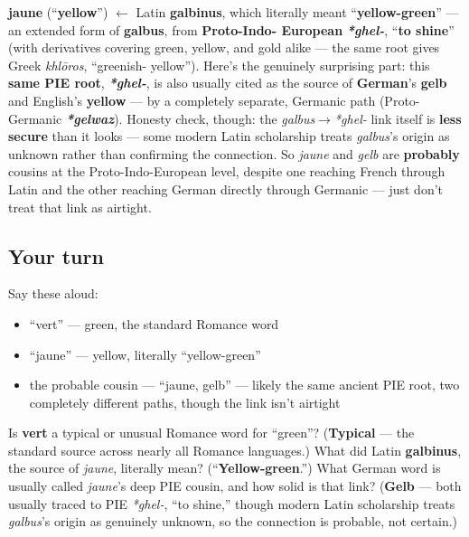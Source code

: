\begin{cousinweb}
\textbf{jaune} (\textquotedblleft{}\textbf{yellow}\textquotedblright{}) $\leftarrow$ Latin \textbf{galbinus}, which literally meant \textquotedblleft{}\textbf{yellow-green}\textquotedblright{} — an extended form of \textbf{galbus}, from \textbf{Proto-Indo- European} \emph{\textbf{*ghel-}}, \textquotedblleft{}\textbf{to shine}\textquotedblright{} (with derivatives covering green, yellow, and gold alike — the same root gives Greek \emph{khlōros}, \textquotedblleft{}greenish- yellow\textquotedblright{}). Here's the genuinely surprising part: this \textbf{same PIE root}, \emph{\textbf{*ghel-}}, is also usually cited as the source of \textbf{German}'s \textbf{gelb} and English's \textbf{yellow} — by a completely separate, Germanic path (Proto- Germanic \emph{\textbf{*gelwaz}}). Honesty check, though: the \emph{galbus}$\to$\emph{*ghel-} link itself is \textbf{less secure} than it looks — some modern Latin scholarship treats \emph{galbus}'s origin as unknown rather than confirming the connection. So \emph{jaune} and \emph{gelb} are \textbf{probably} cousins at the Proto-Indo-European level, despite one reaching French through Latin and the other reaching German directly through Germanic — just don't treat that link as airtight.
\end{cousinweb}

\subsection*{Your turn}
Say these aloud:

\begin{itemize}
\raggedright
  \item \textquotedblleft{}vert\textquotedblright{} — green, the standard Romance word
  \item \textquotedblleft{}jaune\textquotedblright{} — yellow, literally \textquotedblleft{}yellow-green\textquotedblright{}
  \item the probable cousin — \textquotedblleft{}jaune, gelb\textquotedblright{} — likely the same ancient PIE root, two completely different paths, though the link isn't airtight
\end{itemize}

\begin{tcolorbox}[breakable,colback=teal!4,colframe=teal!35!black,title={Before you move on}]
Is \textbf{vert} a typical or unusual Romance word for \textquotedblleft{}green\textquotedblright{}? (\textbf{Typical} — the standard source across nearly all Romance languages.) What did Latin \textbf{galbinus}, the source of \emph{jaune}, literally mean? (\textquotedblleft{}\textbf{Yellow-green}.\textquotedblright{}) What German word is usually called \emph{jaune}'s deep PIE cousin, and how solid is that link? (\textbf{Gelb} — both usually traced to PIE \emph{*ghel-}, \textquotedblleft{}to shine,\textquotedblright{} though modern Latin scholarship treats \emph{galbus}'s origin as genuinely unknown, so the connection is probable, not certain.)
\end{tcolorbox}
